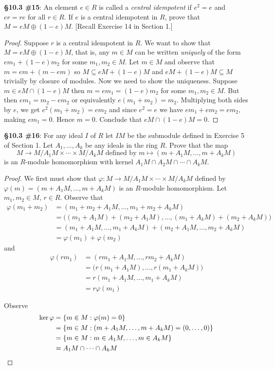 \documentclass[8pt]{amsart}
\theoremstyle{plain}%
\theoremstyle{definition}
\theoremstyle{remark}
\numberwithin{equation}{section}
\begin{document}
\textbf{\S 10.3 \#15}: An element $e \in R$ is called a \textit{central idempotent} if $e^2 = e$ and $er = re$ for all $r \in R$. If $e$ is a central idempotent in $R$, prove that $M = eM \oplus (1 - e)M$. [Recall Exercise 14 in Section 1.]
	\begin{proof}
		Suppose $r$ is a central idempotent in $R$. We want to show that $M = eM \oplus (1 - e)M$, that is, any $m \in M$ can be written \textit{uniquely} of the form $em_1 + (1 - e)m_2$ for some $m_1, m_2 \in M$. Let $m \in M$ and observe that $m = em + (m - em)$ so $M \subseteq eM + (1 - e)M$ and $eM + (1 - e)M \subseteq M$ trivially by closure of modules. Now we need to show the uniqueness. Suppose $m \in eM \cap (1 - e)M$ then $m = em_1 = (1 - e)m_2$ for some $m_1, m_2 \in M$. But then $em_1 = m_2 - em_2$ or equivalently $e(m_1 + m_2) = m_2$. Multiplying both sides by $e$, we get $e^2(m_1 + m_2) = em_2$ and since $e^2 = e$ we have $em_1 + em_2 = em_2$, making $em_1 = 0$. Hence $m = 0$. Conclude that $eM \cap (1 - e)M = 0$.
	\end{proof}


\textbf{\S 10.3 \#16}: For any ideal $I$ of $R$ let $IM$ be the submodule defined in Exercise 5 of Section 1. Let $A_1, \ldots, A_k$ be any ideals in the ring $R$. Prove that the map $$M \to M/A_1M \times \cdots \times M/A_kM \text{ defined by } m \mapsto (m + A_1M, \ldots, m + A_kM)$$ is an $R$-module homomorphism with kernel $A_1M \cap A_2M \cap \cdots \cap A_kM$.
	\begin{proof}
		We first must show that $\varphi : M \to M/A_1M \times \cdots \times M/A_kM$ defined by $\varphi(m) = (m + A_1M, \ldots, m + A_kM)$ is an $R$-module homomorphism. Let $m_1, m_2 \in M$, $r \in R$. Observe that
		\begin{align*}
			\varphi(m_1 + m_2) &= (m_1 + m_2 + A_1M, \ldots, m_1 + m_2 + A_kM)\\
			&= \big((m_1 + A_1M) + (m_2 + A_1M), \ldots, (m_1 + A_kM) + (m_2 + A_kM)\big)\\
			&= (m_1 + A_1M, \ldots, m_1 + A_kM) + (m_2 + A_1M, \ldots, m_2 + A_kM)\\
			&= \varphi(m_1) + \varphi(m_2)
		\end{align*}
		and
		\begin{align*}
			\varphi(rm_1) &= (rm_1 + A_1M, \ldots, rm_2 + A_kM)\\
			&= \big(r(m_1 + A_1M), \ldots, r(m_1 + A_kM)\big)\\
			&= r(m_1 + A_1M, \ldots, m_1 + A_kM)\\
			&= r\varphi(m_1)
		\end{align*}
		
		Observe
		\begin{align*}
			\ker \varphi &= \{m \in M : \varphi(m) = 0\}\\
			&= \{m \in M : (m + A_1M, \ldots, m + A_kM) = (0, \ldots, 0)\}\\
			&= \{m \in M : m \in A_1M, \ldots, m \in A_kM\}\\
			&= A_1M \cap \cdots \cap A_kM \qedhere
		\end{align*}
	\end{proof}
\end{document}

